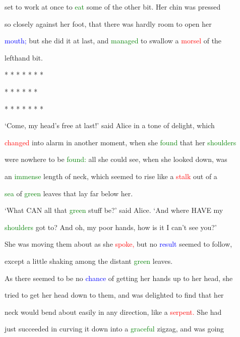  set to work at once to \textcolor{green}{eat} some of the other bit. Her chin was pressed

 so closely against her foot, that there was hardly room to open her

 \textcolor{blue}{mouth;} but she did it at last, and \textcolor{green}{managed} to swallow a \textcolor{red}{morsel} of the

 lefthand bit.





 * * * * * * *



 * * * * * *



 * * * * * * *



 ‘Come, my head’s free at last!’ said Alice in a tone of \textcolor{BurntOrange}{delight,} which

 \textcolor{red}{changed} into \textcolor{BurntOrange}{alarm} in another moment, when she \textcolor{green}{found} that her \textcolor{green}{shoulders}

 were nowhere to be \textcolor{green}{found:} all she could see, when she looked down, was

 an \textcolor{green}{immense} length of neck, which seemed to rise like a \textcolor{red}{stalk} out of a

 \textcolor{green}{sea} of \textcolor{green}{green} leaves that lay far below her.



 ‘What CAN all that \textcolor{green}{green} stuff be?’ said Alice. ‘And where HAVE my

 \textcolor{green}{shoulders} got to? And oh, my poor hands, how is it I can’t see you?’

 She was moving them about as she \textcolor{red}{spoke,} but no \textcolor{blue}{result} seemed to follow,

 except a little shaking among the distant \textcolor{green}{green} leaves.



 As there seemed to be no \textcolor{blue}{chance} of getting her hands up to her head, she

 tried to get her head down to them, and was \textcolor{BurntOrange}{delighted} to find that her

 neck would bend about easily in any direction, like a \textcolor{red}{serpent.} She had

 just \textcolor{BurntOrange}{succeeded} in curving it down into a \textcolor{green}{graceful} zigzag, and was going

